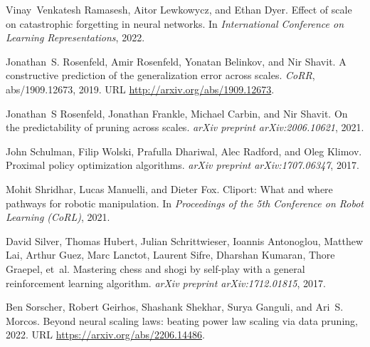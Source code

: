 \documentclass{article} %
\begin{document}
\begin{thebibliography}{67}
Vinay~Venkatesh Ramasesh, Aitor Lewkowycz, and Ethan Dyer.
\newblock Effect of scale on catastrophic forgetting in neural networks.
\newblock In \emph{International Conference on Learning Representations}, 2022.

Jonathan~S. Rosenfeld, Amir Rosenfeld, Yonatan Belinkov, and Nir Shavit.
\newblock A constructive prediction of the generalization error across scales.
\newblock \emph{CoRR}, abs/1909.12673, 2019.
\newblock URL \url{http://arxiv.org/abs/1909.12673}.

Jonathan~S Rosenfeld, Jonathan Frankle, Michael Carbin, and Nir Shavit.
\newblock On the predictability of pruning across scales.
\newblock \emph{arXiv preprint arXiv:2006.10621}, 2021.

John Schulman, Filip Wolski, Prafulla Dhariwal, Alec Radford, and Oleg Klimov.
\newblock Proximal policy optimization algorithms.
\newblock \emph{arXiv preprint arXiv:1707.06347}, 2017.

Mohit Shridhar, Lucas Manuelli, and Dieter Fox.
\newblock Cliport: What and where pathways for robotic manipulation.
\newblock In \emph{Proceedings of the 5th Conference on Robot Learning (CoRL)},
  2021.

David Silver, Thomas Hubert, Julian Schrittwieser, Ioannis Antonoglou, Matthew
  Lai, Arthur Guez, Marc Lanctot, Laurent Sifre, Dharshan Kumaran, Thore
  Graepel, et~al.
\newblock Mastering chess and shogi by self-play with a general reinforcement
  learning algorithm.
\newblock \emph{arXiv preprint arXiv:1712.01815}, 2017.

Ben Sorscher, Robert Geirhos, Shashank Shekhar, Surya Ganguli, and Ari~S.
  Morcos.
\newblock Beyond neural scaling laws: beating power law scaling via data
  pruning, 2022.
\newblock URL \url{https://arxiv.org/abs/2206.14486}.


\end{thebibliography}
\end{document}
